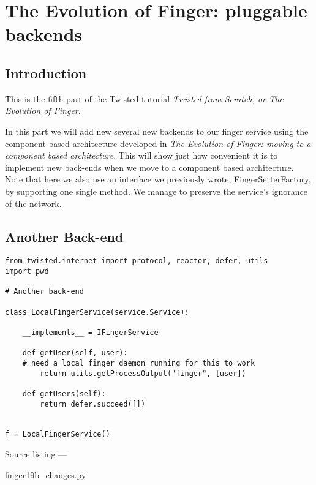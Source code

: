 \section{The Evolution of Finger: pluggable backends\label{doc/howto/tutorial/backends.xhtml}}


\subsection{Introduction}


 This is the fifth part of the Twisted tutorial \textit{Twisted from Scratch, or The Evolution of Finger}.

In this part we will add new several new backends to our finger service using the component-based architecture developed in \textit{The Evolution of Finger: moving to a component based architecture}. This will show just how convenient it is to implement new back-ends when we move to a component based architecture. Note that here we also use an interface we previously wrote, FingerSetterFactory, by supporting one single method. We manage to preserve the service's ignorance of the network.

\subsection{Another Back-end}
\begin{verbatim}
from twisted.internet import protocol, reactor, defer, utils
import pwd

# Another back-end

class LocalFingerService(service.Service):

    __implements__ = IFingerService

    def getUser(self, user):
    # need a local finger daemon running for this to work
        return utils.getProcessOutput("finger", [user])

    def getUsers(self):
        return defer.succeed([])


f = LocalFingerService()
\end{verbatim}\parbox[b]{\linewidth}{\begin{center}Source listing --- \begin{em}finger19b\_changes.py\end{em}\end{center}}

